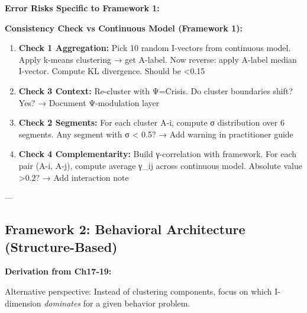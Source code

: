 \textbf{Error Risks Specific to Framework 1:}

\textbf{Consistency Check vs Continuous Model (Framework 1):}
\begin{enumerate}[nosep]
\item \textbf{Check 1 Aggregation:} Pick 10 random I-vectors from continuous model. Apply k-means clustering → get A-label. Now reverse: apply A-label median I-vector. Compute KL divergence. Should be <0.15
\item \textbf{Check 3 Context:} Re-cluster with Ψ=Crisis. Do cluster boundaries shift? Yes? → Document Ψ-modulation layer
\item \textbf{Check 2 Segments:} For each cluster A-i, compute σ distribution over 6 segments. Any segment with σ < 0.5? → Add warning in practitioner guide
\item \textbf{Check 4 Complementarity:} Build γ-correlation with framework. For each pair (A-i, A-j), compute average γ_ij across continuous model. Absolute value >0.2? → Add interaction note
\end{enumerate}

---

\subsection{Framework 2: Behavioral Architecture (Structure-Based)}
\label{subsec:20-framework-2}

\textbf{Derivation from Ch17-19:}

Alternative perspective: Instead of clustering components, focus on which I-dimension \textit{dominates} for a given behavior problem.


